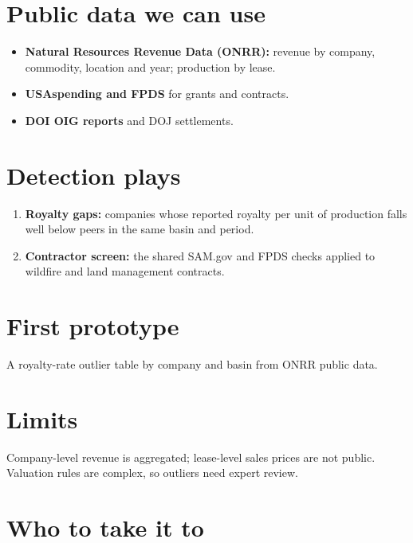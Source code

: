 \documentclass[letterpaper,11pt]{article}
\providecommand{\tightlist}{\setlength{\itemsep}{0pt}\setlength{\parskip}{0pt}}
\begin{document}
\hypertarget{public-data-we-can-use}{%
\section{Public data we can use}\label{public-data-we-can-use}}

\begin{itemize}
\tightlist
\item
  \textbf{Natural Resources Revenue Data (ONRR):} revenue by company,
  commodity, location and year; production by lease.
\item
  \textbf{USAspending and FPDS} for grants and contracts.
\item
  \textbf{DOI OIG reports} and DOJ settlements.
\end{itemize}

\hypertarget{detection-plays}{%
\section{Detection plays}\label{detection-plays}}

\begin{enumerate}
\def\labelenumi{\arabic{enumi}.}
\tightlist
\item
  \textbf{Royalty gaps:} companies whose reported royalty per unit of
  production falls well below peers in the same basin and period.
\item
  \textbf{Contractor screen:} the shared SAM.gov and FPDS checks applied
  to wildfire and land management contracts.
\end{enumerate}

\hypertarget{first-prototype}{%
\section{First prototype}\label{first-prototype}}

A royalty-rate outlier table by company and basin from ONRR public data.

\hypertarget{limits}{%
\section{Limits}\label{limits}}

Company-level revenue is aggregated; lease-level sales prices are not
public. Valuation rules are complex, so outliers need expert review.

\hypertarget{who-to-take-it-to}{%
\section{Who to take it to}\label{who-to-take-it-to}}
\end{document}
